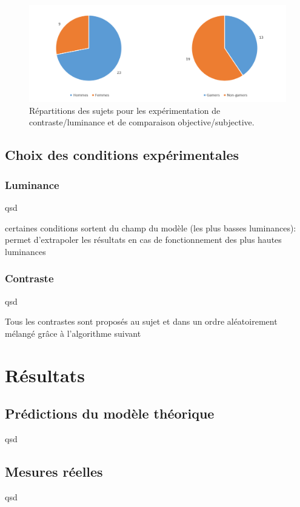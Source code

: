 	\begin{figure}
		\centering
		\includegraphics[scale=0.8]{Figures/SubjectsCharts}
		\caption{Répartitions des sujets pour les expérimentation de contraste/luminance et de comparaison objective/subjective.}
		\label{fig:expe_sujets}
	\end{figure}
	
	\section{Choix des conditions expérimentales}
	\subsection{Luminance}
	\par qsd
	
	\par certaines conditions sortent du champ du modèle (les plus basses luminances): permet d'extrapoler les résultats en cas de fonctionnement des plus hautes luminances
	
	\subsection{Contraste}
	\par qsd
	
	\par Tous les contrastes sont proposés au sujet et dans un ordre aléatoirement mélangé grâce à l'algorithme suivant
	
	
	
	
\chapter{Résultats}
	\section{Prédictions du modèle théorique}
	\par qsd
	
	\section{Mesures réelles}
	\par qsd